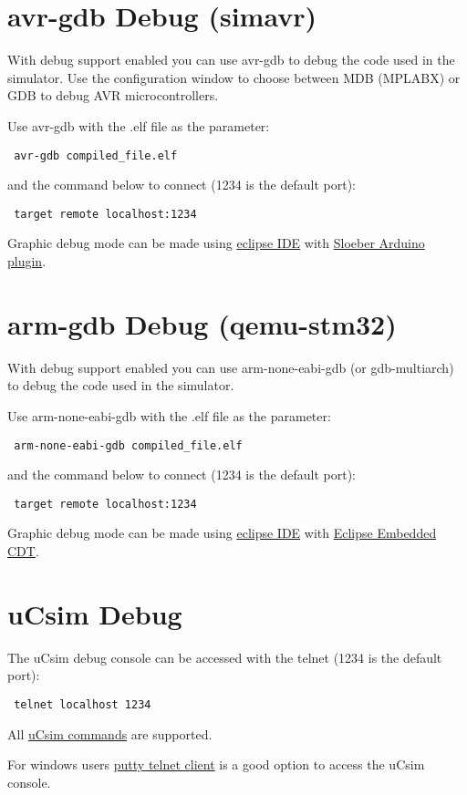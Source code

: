 \section{avr-gdb Debug (simavr)} \hypertarget{def:gdbavr}{}
 
 With debug support enabled you can use avr-gdb to debug the code used in the simulator. 
 Use the configuration window to choose between MDB (MPLABX) or GDB to debug AVR microcontrollers. 
 
 
 Use avr-gdb with the .elf file as the parameter:
 \begin{verbatim}
 avr-gdb compiled_file.elf
 \end{verbatim}
 and the command below to connect (1234 is the default port):
 \begin{verbatim}
 target remote localhost:1234
 \end{verbatim}

Graphic debug mode can be made using \href{https://www.eclipse.org/}{eclipse IDE} with \href{https://eclipse.baeyens.it/}{Sloeber Arduino plugin}.
 

 \section{arm-gdb Debug (qemu-stm32)} \hypertarget{def:gdbarm}{}
 
 With debug support enabled you can use arm-none-eabi-gdb (or gdb-multiarch) to debug the code used in the simulator. 
 
 Use arm-none-eabi-gdb with the .elf file as the parameter:
 \begin{verbatim}
 arm-none-eabi-gdb compiled_file.elf
 \end{verbatim}
 and the command below to connect (1234 is the default port):
 \begin{verbatim}
 target remote localhost:1234
 \end{verbatim}

Graphic debug mode can be made using \href{https://www.eclipse.org/}{eclipse IDE} with 
\href{https://projects.eclipse.org/projects/iot.embed-cdt}{Eclipse Embedded CDT}.
 
\section{uCsim Debug} \hypertarget{def:ucsim}{}
  
The uCsim debug console can be accessed with the telnet (1234 is the default port):
 \begin{verbatim}
 telnet localhost 1234
 \end{verbatim}
 
All \href{http://mazsola.iit.uni-miskolc.hu/\%7edrdani/embedded/ucsim/cmd.html}{uCsim commands} are supported.  

For windows users \href{https://www.putty.org/}{putty telnet client} is a good option to access the uCsim console. 
 
  
